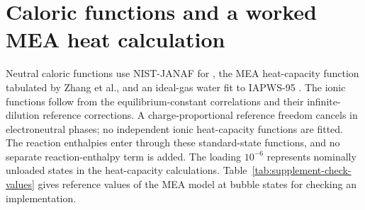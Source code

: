 \documentclass[a4paper,11pt]{article}
\begin{document}
\section{Caloric functions and a worked MEA heat calculation}\label{sec:s-files}
Neutral caloric functions use NIST-JANAF for \COtwo, the MEA heat-capacity function tabulated by Zhang et al., and an ideal-gas water fit to IAPWS-95 \cite{chaseNISTJANAFThermochemicalTables1998,Zhang2011,internationalassociationforthepropertiesofwaterandsteamRevisedReleaseIAPWS2018}.
The ionic functions follow from the equilibrium-constant correlations and their infinite-dilution reference corrections.
A charge-proportional reference freedom cancels in electroneutral phases; no independent ionic heat-capacity functions are fitted.
The reaction enthalpies enter through these standard-state functions, and no separate reaction-enthalpy term is added.
The loading $10^{-6}$ represents nominally unloaded states in the heat-capacity calculations.
Table~\ref{tab:supplement-check-values} gives reference values of the MEA model at  bubble states for checking an implementation.


\end{document}

